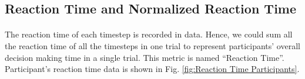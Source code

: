 \subsection{Reaction Time and Normalized Reaction Time}
\label{sec:Reaction Time and Normalized Reaction Time}
\paragraph{}
The reaction time of each timestep is recorded in data. Hence, we could sum all the reaction time of all the timesteps in one trial to represent participants' overall decision making time in a single trial. This metric is named \enquote{Reaction Time}. Participant's reaction time data is shown in Fig. \ref{fig:Reaction Time Participants}. 

\begin{figure}[ht]
\centering
{}
\end{figure}
